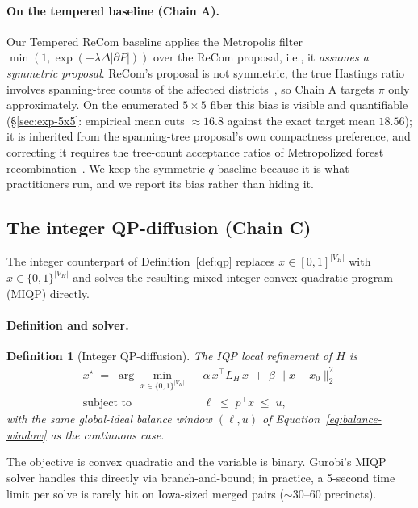 \documentclass[11pt]{article}
\newtheorem{definition}{Definition}[section]
\begin{document}
\paragraph{On the tempered baseline (Chain A).} Our Tempered ReCom
baseline applies the Metropolis filter
$\min(1, \exp(-\lambda \Delta|\partial P|))$ over the ReCom proposal,
i.e., it \emph{assumes a symmetric proposal}. ReCom's proposal is not
symmetric, the true Hastings ratio involves spanning-tree counts of
the affected districts~\cite{autry2023metropolized,cannon2022spanning}, so Chain A targets $\pi$ only approximately. On the enumerated
$5 \times 5$ fiber this bias is visible and quantifiable
(\S\ref{sec:exp-5x5}: empirical mean cuts $\approx 16.8$ against the
exact target mean $18.56$); it is inherited from the spanning-tree
proposal's own compactness preference, and correcting it requires the
tree-count acceptance ratios of Metropolized forest
recombination~\cite{autry2023metropolized}. We keep the symmetric-$q$
baseline because it is what practitioners run, and we report its bias
rather than hiding it.

\subsection{The integer QP-diffusion (Chain C)}\label{sec:iqp}

The integer counterpart of Definition~\ref{def:qp} replaces
$x \in [0,1]^{|V_H|}$ with $x \in \{0, 1\}^{|V_H|}$ and solves the
resulting mixed-integer convex quadratic program (MIQP) directly.

\paragraph{Definition and solver.}\label{sec:iqp-def}

\begin{definition}[Integer QP-diffusion]\label{def:iqp}
The IQP local refinement of $H$ is
\begin{align}
  x^\star \;=\; \arg\min_{x \in \{0,1\}^{|V_H|}} \;\;
    & \alpha\, x^\top L_H\, x \;+\; \beta\, \|x - x_0\|_2^2 \label{eq:iqp-obj} \\
  \text{subject to} \;\;
    & \ell \;\le\; p^\top x \;\le\; u,
\end{align}
with the same global-ideal balance window $(\ell, u)$ of
Equation~\eqref{eq:balance-window} as the continuous case.
\end{definition}

The objective is convex quadratic and the variable is binary.
Gurobi's MIQP solver handles this directly via branch-and-bound; in
practice, a 5-second time limit per solve is rarely hit on Iowa-sized
merged pairs ($\sim 30$--$60$ precincts).
\end{document}
